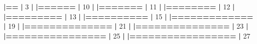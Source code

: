 \documentclass[]{book}
\newenvironment{Shaded}{\begin{snugshade}}{\end{snugshade}}
\newcommand{\DecValTok}[1]{\textcolor[rgb]{0.00,0.00,0.81}{#1}}
\newcommand{\ErrorTok}[1]{\textcolor[rgb]{0.64,0.00,0.00}{\textbf{#1}}}
\newcommand{\NormalTok}[1]{#1}
\newcommand{\OperatorTok}[1]{\textcolor[rgb]{0.81,0.36,0.00}{\textbf{#1}}}
\newcommand{\StringTok}[1]{\textcolor[rgb]{0.31,0.60,0.02}{#1}}
\begin{document}
\begin{Shaded}
\begin{Highlighting}[]
{\StringTok{  }\ErrorTok{|==}\StringTok{                                                               }\ErrorTok{|}\StringTok{   }\DecValTok{3}\NormalTok{%}
  \OperatorTok{|}\StringTok{                                                                       }
\StringTok{  }\ErrorTok{|======}\StringTok{                                                           }\ErrorTok{|}\StringTok{  }\DecValTok{10}\NormalTok{%}
  \OperatorTok{|}\StringTok{                                                                       }
\StringTok{  }\ErrorTok{|=======}\StringTok{                                                          }\ErrorTok{|}\StringTok{  }\DecValTok{11}\NormalTok{%}
  \OperatorTok{|}\StringTok{                                                                       }
\StringTok{  }\ErrorTok{|========}\StringTok{                                                         }\ErrorTok{|}\StringTok{  }\DecValTok{12}\NormalTok{%}
  \OperatorTok{|}\StringTok{                                                                       }
\StringTok{  }\ErrorTok{|=========}\StringTok{                                                        }\ErrorTok{|}\StringTok{  }\DecValTok{13}\NormalTok{%}
  \OperatorTok{|}\StringTok{                                                                       }
\StringTok{  }\ErrorTok{|==========}\StringTok{                                                       }\ErrorTok{|}\StringTok{  }\DecValTok{15}\NormalTok{%}
  \OperatorTok{|}\StringTok{                                                                       }
\StringTok{  }\ErrorTok{|=============}\StringTok{                                                    }\ErrorTok{|}\StringTok{  }\DecValTok{19}\NormalTok{%}
  \OperatorTok{|}\StringTok{                                                                       }
\StringTok{  }\ErrorTok{|==============}\StringTok{                                                   }\ErrorTok{|}\StringTok{  }\DecValTok{21}\NormalTok{%}
  \OperatorTok{|}\StringTok{                                                                       }
\StringTok{  }\ErrorTok{|===============}\StringTok{                                                  }\ErrorTok{|}\StringTok{  }\DecValTok{23}\NormalTok{%}
  \OperatorTok{|}\StringTok{                                                                       }
\StringTok{  }\ErrorTok{|================}\StringTok{                                                 }\ErrorTok{|}\StringTok{  }\DecValTok{25}\NormalTok{%}
  \OperatorTok{|}\StringTok{                                                                       }
\StringTok{  }\ErrorTok{|=================}\StringTok{                                                }\ErrorTok{|}\StringTok{  }\DecValTok{27}\NormalTok{%}
}}}}}}}}}}}}
\end{Highlighting}
\end{Shaded}
\end{document}
